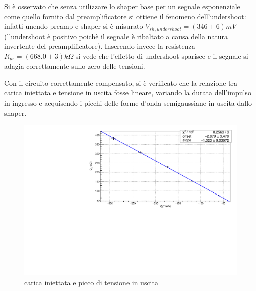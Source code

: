\documentclass{article}
\begin{document}
Si è osservato che senza utilizzare lo shaper base per un segnale esponenziale come quello fornito dal preamplificatore si ottiene il 
fenomeno dell'undershoot: infatti unendo preamp e shaper si è misurato $V_{sh, undershoot}=(346 \pm 6)mV$ (l'undershoot è positivo poichè
il segnale è ribaltato a causa della natura invertente del preamplificatore). Inserendo invece la resistenza 
$R_{pz} = (668.0 \pm 3) k\Omega$ si vede che l'effetto di undershoot sparisce e il segnale si adagia correttamente sullo zero 
delle tensioni.

Con il circuito correttamente compensato, si è verificato che la relazione tra carica iniettata e tensione in uscita fosse
lineare, variando la durata dell'impulso in ingresso e acquisendo i picchi delle forme d'onda semigaussiane in uscita dallo shaper.

\begin{center}
    \begin{figure}[H]
    \centering
    \includegraphics[scale=0.375, angle=0]{fitshaper.pdf}
    \caption{carica iniettata e picco di tensione in uscita}
    \label{fig:fitshaper}
    \end{figure}
\end{center}
\end{document}
